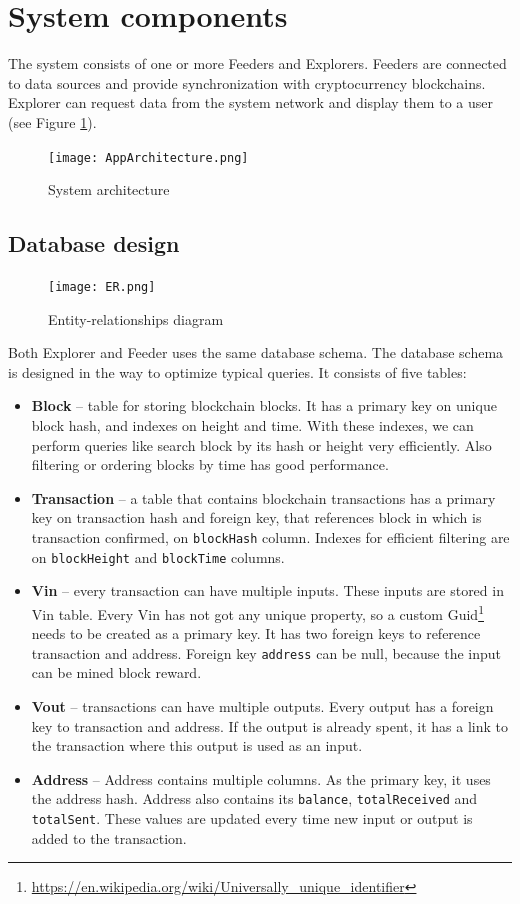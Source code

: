 \section{System components}
The system consists of one or more Feeders and Explorers. Feeders are connected to data sources and provide synchronization with cryptocurrency blockchains. Explorer can request data from the system network and display them to a user (see Figure \ref{systemArchitecture}).

\begin{figure}[h]
    \centering
    \texttt{[image: AppArchitecture.png]}
    \caption{System architecture}
    \label{systemArchitecture}
\end{figure}

\subsection{Database design}
\label{design}

\begin{figure}[h]
    \centering
    \texttt{[image: ER.png]}
    \caption{Entity-relationships diagram}
    \label{er}
\end{figure}

Both Explorer and Feeder uses the same database schema. The database schema is designed in the way to optimize typical queries. It consists of five tables:
\begin{itemize}
    \item \textbf{Block} -- table for storing blockchain blocks. It has a primary key on unique block hash, and indexes on height and time. With these indexes, we can perform queries like search block by its hash or height very efficiently. Also filtering or ordering blocks by time has good performance.
    \item \textbf{Transaction} -- a table that contains blockchain transactions has a primary key on transaction hash and foreign key, that references block in which is transaction confirmed, on \texttt{blockHash} column. Indexes for efficient filtering are on \texttt{blockHeight} and \texttt{blockTime} columns. 
    \item \textbf{Vin} -- every transaction can have multiple inputs. These inputs are stored in Vin table. Every Vin has not got any unique property, so a custom Guid\footnote{\url{https://en.wikipedia.org/wiki/Universally_unique_identifier}} needs to be created as a primary key. It has two foreign keys to reference transaction and address. Foreign key \texttt{address} can be null, because the input can be mined block reward.
    \item \textbf{Vout} -- transactions can have multiple outputs. Every output has a foreign key to transaction and address. If the output is already spent, it has a link to the transaction where this output is used as an input.
    \item \textbf{Address} -- Address contains multiple columns. As the primary key, it uses the address hash. Address also contains its \texttt{balance}, \texttt{totalReceived} and \texttt{totalSent}. These values are updated every time new input or output is added to the transaction.  
\end{itemize}



